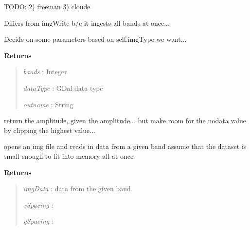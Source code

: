 \documentclass[letterpaper,10pt,openany,oneside]{sphinxmanual}
\begin{document}
\begin{fulllineitems}
\begin{fulllineitems}
TODO: 2) freeman 3) cloude

Differs from imgWrite b/c it ingests all bands at once...

\end{fulllineitems}


\begin{fulllineitems}
\label{code:Image.Image.fnameGenerate}
Decide on some parameters based on self.imgType we want...

\textbf{Returns}
\begin{quote}

\emph{bands}    : Integer

\emph{dataType} : GDal data type

\emph{outname}  : String
\end{quote}

\end{fulllineitems}


\begin{fulllineitems}
\label{code:Image.Image.getAmp}
return the amplitude, given the amplitude... but make room for
the nodata value by clipping the highest value...

\end{fulllineitems}


\begin{fulllineitems}
\label{code:Image.Image.getBandData}
opens an img file and reads in data from a given band
assume that the dataset is small enough to fit into memory all at once

\textbf{Returns}
\begin{quote}

\emph{imgData}  : data from the given band

\emph{xSpacing} :

\emph{ySpacing} :
\end{quote}

\end{fulllineitems}



\end{fulllineitems}
\end{document}
